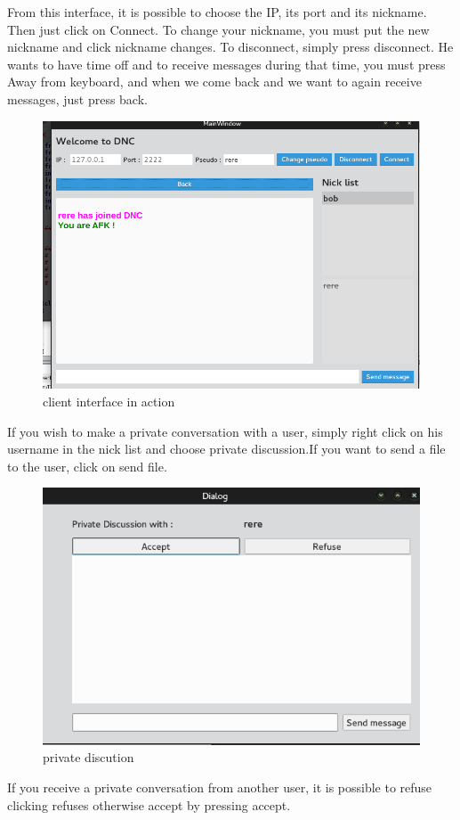 \documentclass[12pt]{article}
\begin{document}
\begin{flushleft}
From this interface, it is possible to choose the IP, its port and its nickname. Then just click on Connect. To change your nickname, you must put the new nickname and click nickname changes. To disconnect, simply press disconnect. He wants to have time off and to receive messages during that time, you must press Away from keyboard, and when we come back and we want to again receive messages, just press back.

 \begin{figure}
    \includegraphics[scale=0.5]{lancement.png}    

    \caption{client interface in action}
\end{figure}
If you wish to make a private conversation with a user, simply right click on his username in the nick list and choose private discussion.If you want to send a file to the user, click on send file.

\begin{figure}
        \includegraphics[scale=0.5]{pm.png}
    \caption{private discution}
\end{figure}       
If you receive a private conversation from another user, it is possible to refuse clicking refuses otherwise accept by pressing accept.
    

\end{flushleft}
\end{document}
